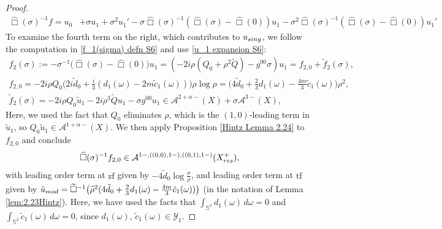 \documentclass[10pt,a4paper,reqno]{amsart}
\newcommand{\A}{\mathcal{A}}
\newcommand{\tface}{{\mathrm{tf}}}
\newcommand{\zface}{{\mathrm{zf}}}
\renewcommand{\S}{{\mathbb S}}
\let\hat\widehat
\theoremstyle{definition}
\theoremstyle{remark}
\numberwithin{equation}{section}
\newcommand{\cA}{\mathcal A}
\newcommand{\wh}{\widehat}
\begin{document}
\begin{proof}
\begin{equation}
\label{resolvent expansion 2 S6}
    \begin{split}
    \wh\Box(\sigma)^{-1} f = u_0 &+ \sigma u_1 + \sigma^2 u_1' - \sigma\wh\Box(\sigma)^{-1} (\wh\Box(\sigma)-\wh\Box(0))u_1 - \sigma^2\wh\Box(\sigma)^{-1} (\wh\Box(\sigma)-\wh\Box(0))u_1'
\end{split}
\end{equation}
To examine the fourth term on the right, which contributes to $u_{\rm sing}$, we follow the computation in \eqref{f_1(sigma) defn S6} and use \eqref{u_1 expansion S6}:
\begin{equation}
\label{f_2 expansion S6}
\begin{gathered}
    f_2(\sigma) := -\sigma^{-1}\bigl(\wh\Box(\sigma)-\wh\Box(0)\bigr)u_1 = (-2i\rho(Q_0 + \rho^2\widetilde{Q})-g^{00}\sigma)u_1 = f_{2,0} + \tilde f_2(\sigma), \\
    f_{2,0} = -2i\rho Q_0 \bigl(2i\tilde{d}_0 + \frac{i}{3}(d_1(\omega)-2m\tilde{c}_1(\omega))\bigr)\rho\log\rho = \bigl(4 \tilde{d}_0 + \frac{2}{3}d_1(\omega) - \frac{4m}{3}\tilde{c}_1(\omega) \bigr)\rho^2,\\
    \tilde f_2(\sigma) = -2i\rho Q_0\tilde{u}_1 - 2i\rho^3\widetilde{Q}u_1 - \sigma g^{00} u_1 \in \A^{2+\alpha-}(X) + \sigma\A^{3-}(X),
\end{gathered}
\end{equation}
Here, we used the fact that $Q_0$ eliminates $\rho$, which is the $(1,0)$-leading term in $\tilde{u}_1$, so $Q_0\tilde{u}_1\in \A^{1+\alpha-}(X)$. We then apply Proposition \ref{Hintz Lemma 2.24} to $f_{2,0}$ and conclude
\begin{equation}
\label{EqPBoxInvf2Nonlin}
  \wh\Box(\sigma)^{-1}f_{2,0} \in \cA^{1-,((0,0),1-),((0,1),1-)}(X^+_{\rm res}),
\end{equation}
with leading order term at $\zface$ given by $-4\tilde{d}_0\log\frac{\sigma}{\rho}$, and leading order term at $\tface$ given by $\Tilde{u}_{\rm{mod}} = \widetilde\Box^{-1}\bigl(\hat\rho^2 (4 \tilde{d}_0 + \frac{2}{3}d_1(\omega) - \frac{4m}{3}\tilde{c}_1(\omega))\bigr)$ (in the notation of Lemma \ref{lem:2.23Hintz}). Here, we have used the facts that $\int_{\S^2} d_1(\omega)\,d\omega=0$ and $\int_{\S^2} \tilde{c}_1(\omega)\,d\omega = 0$, since $d_1(\omega),\,\tilde{c}_1(\omega)\in\mathcal{Y}_1$. %


\end{proof}
\end{document}
